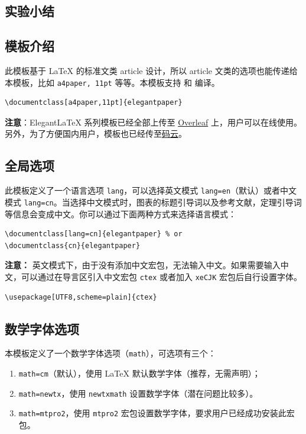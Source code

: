 \documentclass[lang=cn,11pt,a4paper,cite=authoryear]{elegantpaper}
\begin{document}
\subsection{实验小结}

\subsection{模板介绍}

此模板基于 \LaTeX{} 的标准文类 article 设计，所以 article 文类的选项也能传递给本模板，比如 \lstinline{a4paper, 11pt} 等等。本模板支持  和  编译。

\begin{lstlisting}
\documentclass[a4paper,11pt]{elegantpaper}
\end{lstlisting}

\textbf{注意}：Elegant\LaTeX{} 系列模板已经全部上传至 \href{https://www.overleaf.com/latex/templates/elegantpaper-template/yzghrqjhmmmr}{Overleaf} 上，用户可以在线使用。另外，为了方便国内用户，模板也已经传至\href{https://gitee.com/ElegantLaTeX/ElegantPaper}{码云}。


\subsection{全局选项}
此模板定义了一个语言选项 \lstinline{lang}，可以选择英文模式 \lstinline{lang=en}（默认）或者中文模式 \lstinline{lang=cn}。当选择中文模式时，图表的标题引导词以及参考文献，定理引导词等信息会变成中文。你可以通过下面两种方式来选择语言模式：
\begin{lstlisting}
\documentclass[lang=cn]{elegantpaper} % or
\documentclass{cn}{elegantpaper} 
\end{lstlisting}

\textbf{注意：} 英文模式下，由于没有添加中文宏包，无法输入中文。如果需要输入中文，可以通过在导言区引入中文宏包 \lstinline{ctex} 或者加入 \lstinline{xeCJK} 宏包后自行设置字体。 
\begin{lstlisting}
\usepackage[UTF8,scheme=plain]{ctex}
\end{lstlisting}

\subsection{数学字体选项}

本模板定义了一个数学字体选项（\lstinline{math}），可选项有三个：
\begin{enumerate}
  \item \lstinline{math=cm}（默认），使用 \LaTeX{} 默认数学字体（推荐，无需声明）；
  \item \lstinline{math=newtx}，使用 \lstinline{newtxmath} 设置数学字体（潜在问题比较多）。
  \item \lstinline{math=mtpro2}，使用 \lstinline{mtpro2} 宏包设置数学字体，要求用户已经成功安装此宏包。
\end{enumerate}
\end{document}
